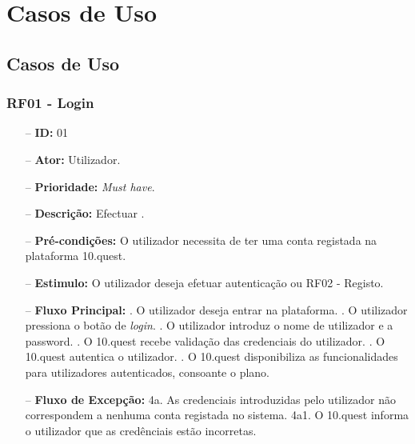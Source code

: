 \chapter{Casos de Uso}
\label{a:cu}

\section{Casos de Uso}

\subsection{RF01 - Login}
\begin{itemize}
	\item[--] \textbf{ID:} 01
	\item[--]  \textbf{Ator:} Utilizador.
	\item[--]  \textbf{Prioridade:} \textit{Must have}.
	\item[--]  \textbf{Descrição:} Efectuar .
	\item[--]  \textbf{Pré-condições:} O utilizador necessita de ter uma conta registada na plataforma 10.quest.
	\item[--]  \textbf{Estimulo:} O utilizador deseja efetuar autenticação ou RF02 - Registo.
	\item[--]  \textbf{Fluxo Principal:} 
			. O utilizador deseja entrar na plataforma.
			. O utilizador pressiona o botão de \textit{login}.
			. O utilizador introduz o nome de utilizador e a password.
			. O 10.quest recebe validação das credenciais do utilizador.
			. O 10.quest autentica o utilizador.
			. O 10.quest disponibiliza as funcionalidades para utilizadores autenticados, consoante o plano.
	\item[--]  \textbf{Fluxo de Excepção:} 
			\subitem 4a. As credenciais introduzidas pelo utilizador não correspondem a nenhuma conta registada no sistema.
			\subitem 4a1. O 10.quest informa o utilizador que as credênciais estão incorretas.
\end{itemize}
\newpage

